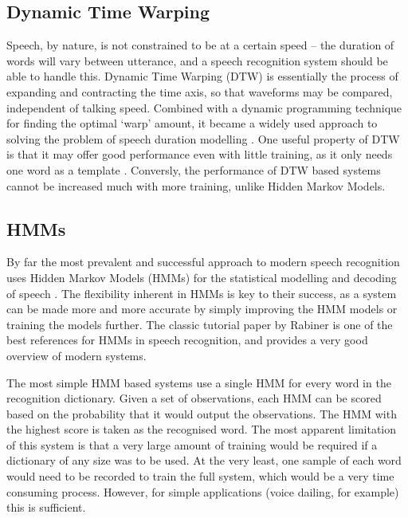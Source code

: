 \subsection{Dynamic Time Warping} %
\label{sub:dynamic_time_warping}
Speech, by nature, is not constrained to be at a certain speed -- the duration of words will vary between utterance, and a speech recognition system should be able to handle this.  Dynamic Time Warping (DTW) is essentially the process of expanding and contracting the time axis, so that waveforms may be compared, independent of talking speed.  Combined with a dynamic programming technique for finding the optimal `warp' amount, it became a widely used approach to solving the problem of speech duration modelling \cite{furui1989speech}.  One useful property of DTW is that it may offer good performance even with little training, as it only needs one word as a template \cite{melnikoff2003speech}.  Conversly, the performance of DTW based systems cannot be increased much with more training, unlike Hidden Markov Models.

\subsection{HMMs \cite{rabiner1989tutorial}} %
\label{sub:about_hmms}
By far the most prevalent and successful approach to modern speech recognition uses Hidden Markov Models (HMMs) for the statistical modelling and decoding of speech \cite{cox1988hidden}.  The flexibility inherent in HMMs is key to their success, as a system can be made more and more accurate by simply improving the HMM models or training the models further.  The classic tutorial paper by Rabiner is one of the best references for HMMs in speech recognition, and provides a very good overview of modern systems.

The most simple HMM based systems use a single HMM for every word in the recognition dictionary.  Given a set of observations, each HMM can be scored based on the probability that it would output the observations.  The HMM with the highest score is taken as the recognised word.  The most apparent limitation of this system is that a very large amount of training would be required if a dictionary of any size was to be used.  At the very least, one sample of each word would need to be recorded to train the full system, which would be a very time consuming process.  However, for simple applications (voice dailing, for example) this is sufficient.

